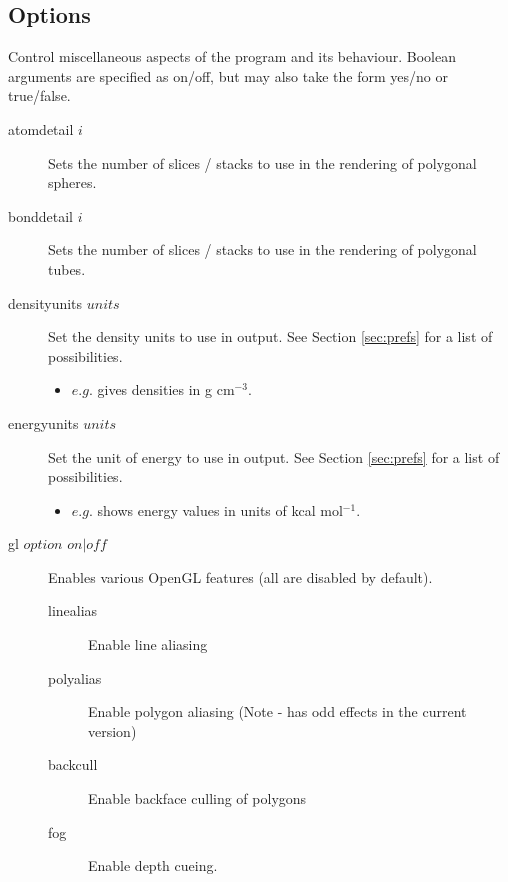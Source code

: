 \subsection{Options}
Control miscellaneous aspects of the program and its behaviour. Boolean arguments are specified as on/off, but may also take the form yes/no or true/false.\\
\begin{description}

	\item[atomdetail $i$\its]
		Sets the number of slices / stacks to use in the rendering of polygonal spheres.
	
	\item[bonddetail $i$\its]
		Sets the number of slices / stacks to use in the rendering of polygonal tubes.

	\item[densityunits $units$\its] Set the density units to use in output. See Section \ref{sec:prefs} for a list of possibilities.
	\begin{itemize}
		\item $e.g.$  gives densities in g cm$^{-3}$.
	\end{itemize}

	\item[energyunits $units$\its] Set the unit of energy to use in output. See Section \ref{sec:prefs} for a list of possibilities.
	\begin{itemize}
		\item $e.g.$  shows energy values in units of kcal mol$^{-1}$.
	\end{itemize}

	\item[gl $option$ $on|off$\its]
		Enables various OpenGL features (all are disabled by default).
		\begin{description}
			\item[linealias] Enable line aliasing
			\item[polyalias] Enable polygon aliasing (Note - has odd effects in the current version)
			\item[backcull] Enable backface culling of polygons
			\item[fog] Enable depth cueing.
		\end{description}
	

\end{description}
